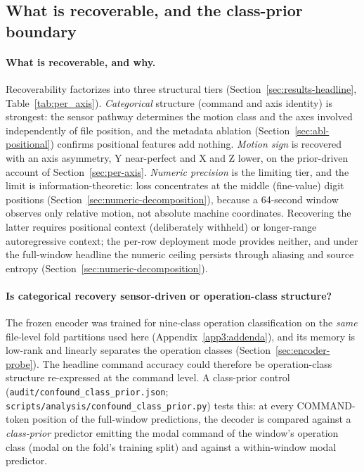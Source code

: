 \documentclass[sensors,article,submit,moreauthors,pdftex]{Definitions/mdpi}
\begin{document}
\subsection{What is recoverable, and the class-prior boundary}
\label{sec:disc-deployment}

\paragraph{What is recoverable, and why.}\label{sec:disc-recoverability}\hspace*{0pt plus 1fill}

Recoverability factorizes into three structural tiers (Section~\ref{sec:results-headline}, Table~\ref{tab:per_axis}). \emph{Categorical} structure (command and axis identity) is strongest: the sensor pathway determines the motion class and the axes involved independently of file position, and the metadata ablation (Section~\ref{sec:abl-positional}) confirms positional features add nothing. \emph{Motion sign} is recovered with an axis asymmetry, Y near-perfect and X and Z lower, on the prior-driven account of Section~\ref{sec:per-axis}. \emph{Numeric precision} is the limiting tier, and the limit is information-theoretic: loss concentrates at the middle (fine-value) digit positions (Section~\ref{sec:numeric-decomposition}), because a 64-second window observes only relative motion, not absolute machine coordinates. Recovering the latter requires positional context (deliberately withheld) or longer-range autoregressive context; the per-row deployment mode provides neither, and under the full-window headline the numeric ceiling persists through aliasing and source entropy (Section~\ref{sec:numeric-decomposition}).\label{sec:disc-failure-mode}

\paragraph{Is categorical recovery sensor-driven or operation-class structure?}\label{sec:disc-confound}\hspace*{0pt plus 1fill}

The frozen encoder was trained for nine-class operation classification on the \emph{same} file-level fold partitions used here (Appendix~\ref{app3:addenda}), and its memory is low-rank and linearly separates the operation classes (Section~\ref{sec:encoder-probe}). The headline command accuracy could therefore be operation-class structure re-expressed at the command level. A class-prior control (\texttt{audit/confound\_class\_prior.json}; \texttt{scripts/analysis/confound\_class\_prior.py}) tests this: at every COMMAND-token position of the full-window predictions, the decoder is compared against a \emph{class-prior} predictor emitting the modal command of the window's operation class (modal on the fold's training split) and against a within-window modal predictor.
\end{document}
